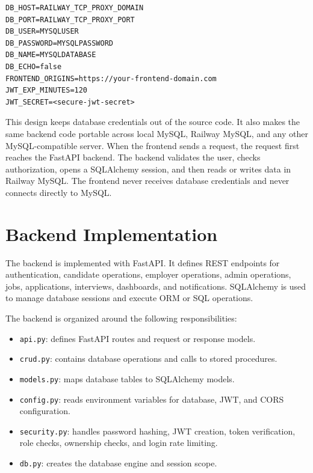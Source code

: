 \documentclass[11pt,a4paper]{report}
\begin{document}
\begin{lstlisting}[caption={Database variables used by the backend}]
DB_HOST=RAILWAY_TCP_PROXY_DOMAIN
DB_PORT=RAILWAY_TCP_PROXY_PORT
DB_USER=MYSQLUSER
DB_PASSWORD=MYSQLPASSWORD
DB_NAME=MYSQLDATABASE
DB_ECHO=false
FRONTEND_ORIGINS=https://your-frontend-domain.com
JWT_EXP_MINUTES=120
JWT_SECRET=<secure-jwt-secret>

\end{lstlisting}

This design keeps database credentials out of the source code. It also makes the same backend code portable across local MySQL, Railway MySQL, and any other MySQL-compatible server. When the frontend sends a request, the request first reaches the FastAPI backend. The backend validates the user, checks authorization, opens a SQLAlchemy session, and then reads or writes data in Railway MySQL. The frontend never receives database credentials and never connects directly to MySQL.

\section{Backend Implementation}

The backend is implemented with FastAPI. It defines REST endpoints for authentication, candidate operations, employer operations, admin operations, jobs, applications, interviews, dashboards, and notifications. SQLAlchemy is used to manage database sessions and execute ORM or SQL operations.

The backend is organized around the following responsibilities:

\begin{itemize}[leftmargin=1.5cm]
  \item \texttt{api.py}: defines FastAPI routes and request or response models.
  \item \texttt{crud.py}: contains database operations and calls to stored procedures.
  \item \texttt{models.py}: maps database tables to SQLAlchemy models.
  \item \texttt{config.py}: reads environment variables for database, JWT, and CORS configuration.
  \item \texttt{security.py}: handles password hashing, JWT creation, token verification, role checks, ownership checks, and login rate limiting.
  \item \texttt{db.py}: creates the database engine and session scope.
\end{itemize}
\end{document}
